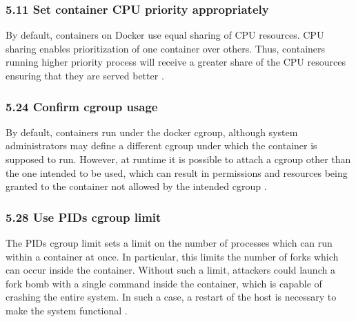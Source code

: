 \subsubsection*{5.11 Set container CPU priority appropriately}

By default, containers on Docker use equal sharing of CPU resources. CPU sharing enables prioritization of one container over others. Thus, containers running higher priority process will receive a greater share of the CPU resources ensuring that they are served better \cite[144-5]{center_for_internet_security}.

\subsubsection*{5.24 Confirm cgroup usage} 
By default, containers run under the docker cgroup, although system administrators may define a different cgroup under which the container is supposed to run. However, at runtime it is possible to attach a cgroup other than the one intended to be used, which can result in permissions and resources being granted to the container not allowed by the intended cgroup \cite[pp 168-9]{center_for_internet_security}.


\subsubsection*{5.28 Use PIDs cgroup limit} The PIDs cgroup limit sets a limit on the number of processes which can run within a container at once. In particular, this limits the number of forks which can occur inside the container. Without such a limit, attackers could launch a fork bomb with a single command inside the container, which is capable of crashing the entire system. In such a case, a restart of the host is necessary to make the system functional \cite[pp 175-6]{center_for_internet_security}.